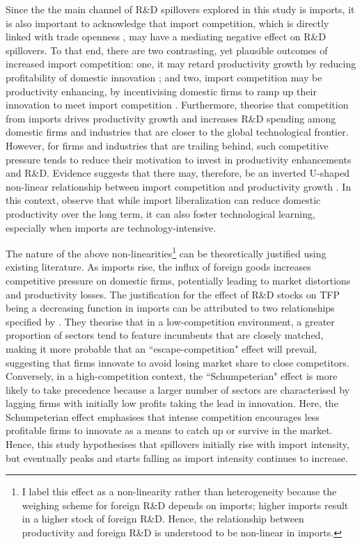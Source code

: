 \documentclass[12pt]{article}
\begin{document}
Since the the main channel of R\&D spillovers explored in this study is imports, it is also important to acknowledge that import competition, which is directly linked with trade openness \citep{Chen2009}, may have a mediating negative effect on R\&D spillovers. To that end, there are two contrasting, yet plausible outcomes of increased import competition: one, it may retard productivity growth by reducing profitability of domestic innovation \citep{Autor2020, Feenstra1996}; and two, import competition may be productivity enhancing, by incentivising domestic firms to ramp up their innovation to meet import competition \citep{Baldwin1992, Bloom2016}. Furthermore, \citet{Aghion2005} theorise that competition from imports drives productivity growth and increases R\&D spending among domestic firms and industries that are closer to the global technological frontier. However, for firms and industries that are trailing behind, such competitive pressure tends to reduce their motivation to invest in productivity enhancements and R\&D. Evidence suggests that there may, therefore, be an inverted U-shaped non-linear relationship between import competition and productivity growth \citep{Aghion2005}. In this context, \citet{Acharya2008} observe that while import liberalization can reduce domestic productivity over the long term, it can also foster technological learning, especially when imports are technology-intensive. 


The nature of the above non-linearities\footnote{I label this effect as a non-linearity rather than heterogeneity because the weighing scheme for foreign R\&D depends on imports; higher imports result in a higher stock of foreign R\&D. Hence, the relationship between productivity and foreign R\&D is understood to be non-linear in imports.} can be theoretically justified using existing literature. As imports rise, the influx of foreign goods increases competitive pressure on domestic firms, potentially leading to market distortions and productivity losses. The justification for the effect of R\&D stocks on TFP being a decreasing function in imports can be attributed to two relationships specified by \citet{Aghion2005}. They theorise that in a low-competition environment, a greater proportion of sectors tend to feature incumbents that are closely matched, making it more probable that an ``escape-competition" effect will prevail, suggesting that firms innovate to avoid losing market share to close competitors. Conversely, in a high-competition context, the ``Schumpeterian" effect is more likely to take precedence because a larger number of sectors are characterised by lagging firms with initially low profits taking the lead in innovation. Here, the Schumpeterian effect emphasises that intense competition encourages less profitable firms to innovate as a means to catch up or survive in the market. Hence, this study hypothesises that spillovers initially rise with import intensity, but eventually peaks and starts falling as import intensity continues to increase.
\end{document}

